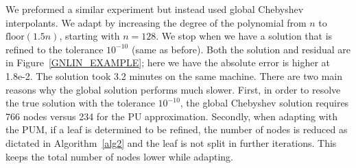 We preformed a similar experiment but instead used global Chebyshev interpolants. We adapt by increasing the degree of the polynomial from $n$ to $\text{floor}(1.5 n)$, starting with $n=128$. We stop when we have a solution that is refined to the tolerance $10^{-10}$ (same as before). Both the solution and residual are in Figure~\ref{GNLIN_EXAMPLE}; here we have the absolute error is higher at 1.8e-2. The solution took 3.2 minutes on the same machine. There are two main reasons why the global solution performs much slower. First, in order to resolve the true solution with the tolerance $10^{-10}$, the global Chebyshev solution requires 766 nodes versus 234 for the PU approximation. Secondly, when adapting with the PUM, if a leaf is determined to be refined, the number of nodes is reduced as dictated in Algorithm~\ref{alg2} and the leaf is not split in further iterations. This keeps the total number of nodes lower while adapting.
 

